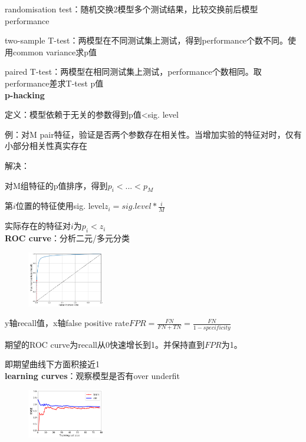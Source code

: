 \documentclass[UTF8]{ctexart}
\begin{document}
  randomisation test：随机交换2模型多个测试结果，比较交换前后模型performance

  two-sample T-test：两模型在不同测试集上测试，得到performance个数不同。使用common variance求p值

  paired T-test：两模型在相同测试集上测试，performance个数相同。取performance差求T-test p值\\
\textbf{p-hacking}

  定义：模型依赖于无关的参数得到p值<sig. level

  \quad 例：对M pair特征，验证是否两个参数存在相关性。当增加实验的特征对时，仅有小部分相关性真实存在

  解决：
  
  \quad 对M组特征的p值排序，得到$p_i < ...< p_M$

  \quad 第$i$位置的特征使用sig. level$z_i = sig. level * \frac{i}{M}$ 

  \quad 实际存在的特征对$i$为$p_i < z_i$\\
\textbf{ROC curve}：分析二元/多元分类

  \begin{figure}[H] %
    \centering %
    \includegraphics[width=0.3\textwidth]{note_images/ROC_curve.png} %
  \end{figure}

  y轴recall值，x轴false positive rate$FPR = \frac{FN}{FN + TN} = \frac{FN}{1-specificity}$

  期望的ROC curve为recall从0快速增长到1。并保持直到$FPR$为1。
  
  \quad 即期望曲线下方面积接近1\\
\textbf{learning curves}：观察模型是否有over underfit

  \begin{figure}[H] %
    \centering %
    \includegraphics[width=0.3\textwidth]{note_images/learning_curve.png} %
  \end{figure}
\end{document}
